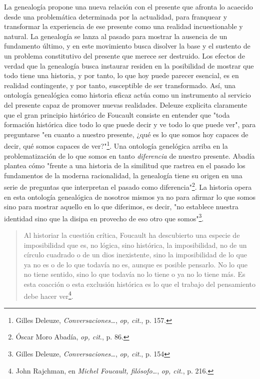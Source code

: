 \documentclass{book}
\begin{document}
La genealogía propone una nueva relación con el presente que afronta lo
acaecido desde una problemática determinada por la actualidad, para
franquear y transformar la experiencia de ese presente como una realidad
incuestionable y natural. La genealogía se lanza al pasado para mostrar
la ausencia de un fundamento último, y en este movimiento busca disolver
la base y el sustento de un problema constitutivo del presente que
merece ser destruido. Los efectos de verdad que la genealogía busca
instaurar residen en la posibilidad de mostrar que todo tiene una
historia, y por tanto, lo que hoy puede parecer esencial, es en realidad
contingente, y por tanto, susceptible de ser transformado. Así, una
ontología genealógica como historia eficaz actúa como un instrumento al
servicio del presente capaz de promover nuevas realidades. Deleuze
explicita claramente que el gran principio histórico de Foucault
consiste en entender que "toda formación histórica dice todo lo que
puede decir y ve todo lo que puede ver", para preguntarse "en cuanto a
nuestro presente, ¿qué es lo que somos hoy capaces de decir, qué somos
capaces de ver?"\footnote{Gilles Deleuze, \emph{Conversaciones\ldots{}},
  \emph{op, cit}., p. 157.}. Una ontología genelógica arriba en la
problematización de lo que somos en tanto \emph{diferencia} de nuestro
presente. Abadía plantea cómo "frente a una historia de la similitud que
rastrea en el pasado los fundamentos de la moderna racionalidad, la
genealogía tiene su origen en una serie de preguntas que interpretan el
pasado como diferencia"\footnote{Óscar Moro Abadía, \emph{op, cit}., p.
  86.}. La historia opera en esta ontología genealógica de nosotros
mismos ya no para afirmar lo que somos sino para mostrar aquello en lo
que diferimos, es decir, "no establece nuestra identidad sino que la
disipa en provecho de eso otro que somos"\footnote{Gilles Deleuze,
  \emph{Conversaciones\ldots{}}, \emph{op, cit}., p. 154}.

\begin{quote}
Al historiar la cuestión crítica, Foucault ha descubierto una especie de
imposibilidad que es, no lógica, sino histórica, la imposibilidad, no de
un círculo cuadrado o de un dios inexistente, sino la imposibilidad de
lo que ya no es o de lo que todavía no es, aunque es posible pensarlo.
No lo que no tiene sentido, sino lo que todavía no lo tiene o ya no lo
tiene más. Es esta coacción o esta exclusión histórica es lo que el
trabajo del pensamiento debe hacer ver\footnote{John Rajchman, en
  \emph{Michel Foucault, filósofo\ldots{}}, \emph{op, cit}., p. 216.}.
\end{quote}
\end{document}
